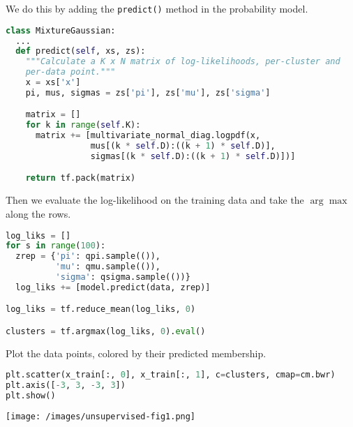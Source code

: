 We do this by adding the \texttt{predict()} method in the
probability model.
\begin{lstlisting}[language=Python]
class MixtureGaussian:
  ...
  def predict(self, xs, zs):
    """Calculate a K x N matrix of log-likelihoods, per-cluster and
    per-data point."""
    x = xs['x']
    pi, mus, sigmas = zs['pi'], zs['mu'], zs['sigma']

    matrix = []
    for k in range(self.K):
      matrix += [multivariate_normal_diag.logpdf(x,
                 mus[(k * self.D):((k + 1) * self.D)],
                 sigmas[(k * self.D):((k + 1) * self.D)])]

    return tf.pack(matrix)
\end{lstlisting}
Then we evaluate the log-likelihood on the training data
and take the $\arg\max$ along the rows.
\begin{lstlisting}[language=Python]
log_liks = []
for s in range(100):
  zrep = {'pi': qpi.sample(()),
          'mu': qmu.sample(()),
          'sigma': qsigma.sample(())}
  log_liks += [model.predict(data, zrep)]

log_liks = tf.reduce_mean(log_liks, 0)

clusters = tf.argmax(log_liks, 0).eval()
\end{lstlisting}

Plot the data points, colored by their predicted membership.
\begin{lstlisting}[language=Python]
plt.scatter(x_train[:, 0], x_train[:, 1], c=clusters, cmap=cm.bwr)
plt.axis([-3, 3, -3, 3])
plt.show()
\end{lstlisting}

\texttt{[image: /images/unsupervised-fig1.png]}
